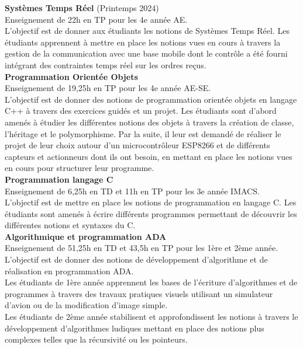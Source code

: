 \documentclass[11pt,a4paper,sans]{moderncv}         %
\begin{document}
{
  \textbf{Syst\`emes Temps R\'eel} (Printemps 2024)\\
  Enseignement de 22h en TP pour les 4e ann\'ee AE.\\
  L'objectif est de donner aux \'etudiants les notions de Syst\`emes Temps R\'eel.
  Les \'etudiants apprennent \`a mettre en place les notions vues en cours \`a travers la gestion de la communication avec une base mobile dont le contr\^ole a \'et\'e fourni int\'egrant des contraintes temps r\'eel sur les ordres re\c cus.\\
  \textbf{Programmation Orient\'ee Objets}\\
  Enseignement de 19,25h en TP pour les 4e ann\'ee AE-SE.\\
  L'objectif est de donner des notions de programmation orient\'ee objets en langage C++ \`a travers des exercices guid\'es et un projet.
  Les \'etudiants sont d'abord amen\'es \`a \'etudier les diff\'erentes notions des objets \`a travers la cr\'eation de classe, l'h\'eritage et le polymorphisme.
  Par la suite, il leur est demand\'e de r\'ealiser le projet de leur choix autour d'un microcontr\^oleur ESP8266 et de diff\'erents capteurs et actionneurs dont ils ont besoin, en mettant en place les notions vues en cours pour structurer leur programme.\\
  \textbf{Programmation langage C}\\
  Enseignement de 6,25h en TD et 11h en TP pour les 3e ann\'ee IMACS.\\
  L'objectif est de mettre en place les notions de programmation en langage C.
  Les \'etudiants sont amen\'es \`a \'ecrire diff\'erents programmes permettant de d\'ecouvrir les diff\'erentes notions et syntaxes du C.\\
  \textbf{Algorithmique et programmation ADA}\\
  Enseignement de 51,25h en TD et 43,5h en TP pour les 1\`ere et 2\`eme ann\'ee.\\
  L'objectif est de donner des notions de d\'eveloppement d'algorithme et de r\'ealisation en programmation ADA.\\
  Les \'etudiants de 1\`ere ann\'ee apprennent les bases de l'\'ecriture d'algorithmes et de programmes \`a travers des travaux pratiques visuels utilisant un simulateur d'avion ou de la modification d'image simple.\\
  Les \'etudiants de 2\`eme ann\'ee stabilisent et approfondissent les notions \`a travers le d\'eveloppement d'algorithmes ludiques mettant en place des notions plus complexes telles que la r\'ecursivit\'e ou les pointeurs.\\
}
\end{document}
